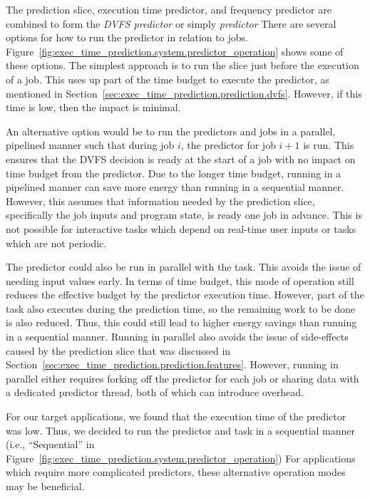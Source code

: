 The prediction slice, execution time predictor, and frequency predictor are
combined to form the \emph{DVFS predictor} or simply \emph{predictor} There are
several options for how to run the predictor in relation to jobs.
Figure~\ref{fig:exec_time_prediction.system.predictor_operation} shows some of
these options.  The simplest approach is to run the slice just before the
execution of a job. This uses up part of the time budget to execute the predictor, as
mentioned in Section~\ref{sec:exec_time_prediction.prediction.dvfs}. However,
if this time is low, then the impact is minimal.

An alternative option would be to run the predictors and jobs in a parallel,
pipelined manner such that during job $i$, the predictor for job $i+1$ is run.
This ensures that the DVFS decision is ready at the start of a job with no
impact on time budget from the predictor. Due to the longer time budget,
running in a pipelined manner can save more energy than running in a sequential
manner. However, this assumes that
information needed by the prediction slice, specifically the job inputs and
program state, is ready one job in advance. This is not possible for
interactive tasks which depend on real-time user inputs or tasks which are not
periodic.

The predictor could also be run in parallel with the task. This avoids the
issue of needing input values early. In terms of time budget, this mode of
operation still reduces the effective budget by the predictor execution time.
However, part of the task also executes during the prediction time, so the
remaining work to be done is also reduced. Thus, this could still lead to
higher energy savings than running in a sequential manner.
Running in parallel also avoids the issue of side-effects
caused by the prediction slice that was discussed in
Section~\ref{sec:exec_time_prediction.prediction.features}. However, running in
parallel either requires forking off the predictor for each job or sharing data
with a dedicated predictor thread, both of which can introduce overhead.

For our target applications, we found that the execution time of the predictor
was low. Thus, we decided to run the predictor and task in a sequential manner
(i.e., ``Sequential'' in
Figure~\ref{fig:exec_time_prediction.system.predictor_operation})
For applications which require more complicated predictors, these alternative
operation modes may be beneficial.

